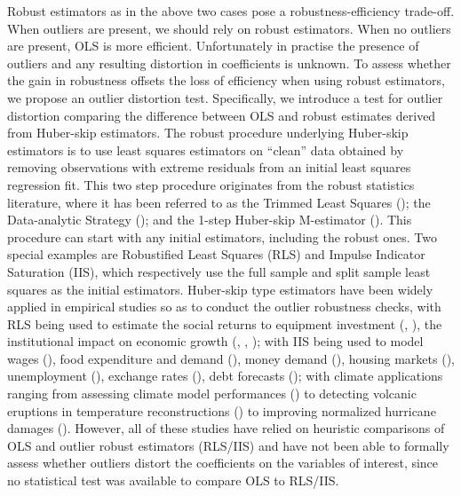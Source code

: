\documentclass[11pt, letterpaper]{article}
\numberwithin{algorithm}{section}
\numberwithin{assumption}{section}
\numberwithin{lemma}{section}
\numberwithin{theorem}{section}
\numberwithin{corollary}{section}
\numberwithin{remark}{section}
\numberwithin{equation}{section}
\numberwithin{figure}{section}
\numberwithin{table}{section}
\begin{document}
Robust estimators as in the above two cases pose a robustness-efficiency trade-off. When outliers are present, we should rely on robust estimators. When no outliers are present, OLS is more efficient. Unfortunately in practise the presence of outliers and any resulting distortion in coefficients is unknown. To assess whether the gain in robustness offsets the loss of efficiency when using robust estimators, we propose an outlier distortion test. Specifically, we introduce a test for outlier distortion comparing the difference between OLS and robust estimates derived from Huber-skip estimators. The robust procedure underlying Huber-skip estimators is to use least squares estimators on ``clean'' data obtained by removing observations with extreme residuals from an initial least squares regression fit. This two step procedure originates from the robust statistics literature, where it has been referred to as the Trimmed Least Squares (\citealt{ruppert1980trimmed}); the Data-analytic Strategy (\citealt{welsh2002journey}); and the 1-step Huber-skip M-estimator (\citealt{johansen2009analysis}). This procedure can start with any initial estimators, including the robust ones. Two special examples are Robustified Least Squares (RLS) and Impulse Indicator Saturation (IIS), which respectively use the full sample and split sample least squares as the initial estimators. Huber-skip type estimators have been widely applied in empirical studies so as to conduct the outlier robustness checks, with RLS being used to estimate the social returns to equipment investment (\citealt{de1991equipment, de1994equipment}, \citealt{auerbach1994reassessing}), the institutional impact on economic growth (\citealt{acemoglu2001colonial, acemoglu2012colonial}, \citealt{albouy2012colonial}, \citealt{acemoglu2019democracy}); with IIS being used to model wages (\citealt{castle2009long}), food expenditure and demand (\citealt{hendry2011econometric}), money demand (\citealt{dreger2014money}), housing markets (\citealt{anundsen2015econometric}), unemployment (\citealt{nymoen2015equilibrium}), exchange rates (\citealt{stillwagon2016non}), debt forecasts (\citealt{ericsson2017biased}); with climate applications ranging from assessing climate model performances (\citealt{pretis2015testing}) to detecting volcanic eruptions in temperature reconstructions (\citealt{schneider2017new}) to improving normalized hurricane damages (\citealt{martinez2020improving}). However, all of these studies have relied on heuristic comparisons of OLS and outlier robust estimators (RLS/IIS) and have not been able to formally assess whether outliers distort the coefficients on the variables of interest, since no statistical test was available to compare OLS to RLS/IIS.
\end{document}
